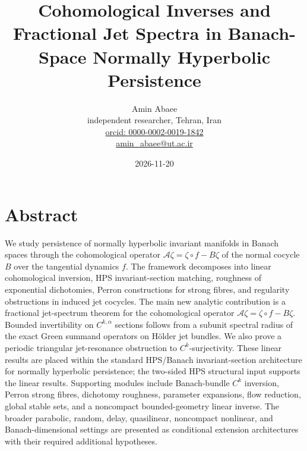 \documentclass[11pt,a4paper]{article}
\title{Cohomological Inverses and Fractional Jet Spectra in Banach-Space Normally Hyperbolic Persistence}
\author{Amin Abaee \\ independent researcher, Tehran, Iran \\ \href{https://orcid.org/0000-0002-0019-1842}{orcid: 0000-0002-0019-1842} \\ \href{mailto:amin_abaee@ut.ac.ir}{amin\_abaee@ut.ac.ir}}
\date{2026-11-20}
\theoremstyle{plain}
\theoremstyle{definition}
\theoremstyle{remark}
\numberwithin{equation}{section}
\numberwithin{figure}{section}
\begin{document}
\maketitle

\section*{Abstract}

We study persistence of normally hyperbolic invariant manifolds in Banach spaces through the cohomological operator $\mathcal A\zeta=\zeta\circ f-B\zeta$ of the normal cocycle $B$ over the tangential dynamics $f$. The framework decomposes into linear cohomological inversion, HPS invariant-section matching, roughness of exponential dichotomies, Perron constructions for strong fibres, and regularity obstructions in induced jet cocycles. The main new analytic contribution is a fractional jet-spectrum theorem for the cohomological operator $\mathcal A\zeta=\zeta\circ f-B\zeta$. Bounded invertibility on $C^{k,\alpha}$ sections follows from a subunit spectral radius of the exact Green summand operators on Hölder jet bundles. We also prove a periodic triangular jet-resonance obstruction to $C^k$-surjectivity. These linear results are placed within the standard HPS/Banach invariant-section architecture for normally hyperbolic persistence; the two-sided HPS structural input supports the linear results. Supporting modules include Banach-bundle $C^k$ inversion, Perron strong fibres, dichotomy roughness, parameter expansions, flow reduction, global stable sets, and a noncompact bounded-geometry linear inverse. The broader parabolic, random, delay, quasilinear, noncompact nonlinear, and Banach-dimensional settings are presented as conditional extension architectures with their required additional hypotheses.

\begin{center}
\end{center}
\end{document}
